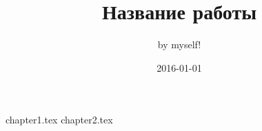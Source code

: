 \documentclass[a4paper,12pt]{article}
\title {Название работы}
\date {2016-01-01}
\author {by myself!}
\begin{document}
	\maketitle
	\clearpage
	\tableofcontents
	\clearpage
	 {chapter1.tex}
	\clearpage
	 {chapter2.tex}
\end{document}
